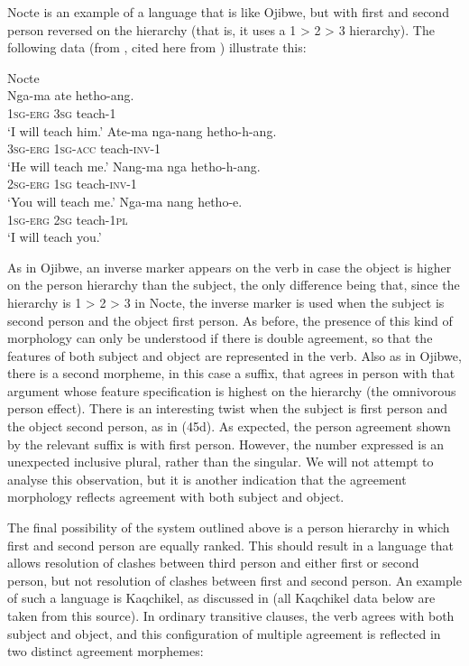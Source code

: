 \documentclass[output=paper]{langsci/langscibook}
\begin{document}
Nocte is an example of a language that is like Ojibwe, but with first and second person reversed on the hierarchy (that is, it uses a 1 > 2 > 3 hierarchy). The following data (from \citealt[641]{DeLancey1981}, cited here from \citealt[172]{Croft2003}) illustrate this:

\ea \label{bkm:Ref328735211}  Nocte\\
\ea\gll  Nga-ma  ate  hetho-ang.  \\
    \textsc{1sg-erg} \textsc{3sg} teach-\textsc{1}\\
\glt    ‘I will teach him.’
\ex \gll  Ate-ma   nga-nang hetho-h-ang.\\
      \textsc{3sg-erg} \textsc{1sg-acc} teach-\textsc{inv-1}\\
\glt     ‘He will teach me.’
\ex \gll Nang-ma nga hetho-h-ang.\\
      \textsc{2sg-erg}  \textsc{1sg} teach-\textsc{inv-1}\\
\glt     ‘You will teach me.’
\ex \gll Nga-ma  nang hetho-e.\\
     \textsc{1sg}-\textsc{erg} \textsc{2sg} teach-\textsc{1pl}\\
\glt    ‘I will teach you.’
\z \z

As in Ojibwe, an inverse marker appears on the verb in case the object is higher on the person hierarchy than the subject, the only difference being that, since the hierarchy is 1 > 2 > 3 in Nocte, the inverse marker is used when the subject is second person and the object first person.  As before, the presence of this kind of morphology can only be understood if there is double agreement, so that the features of both subject and object are represented in the verb. Also as in Ojibwe, there is a second morpheme, in this case a suffix, that agrees in person with that argument whose feature specification is highest on the hierarchy (the omnivorous person effect). There is an interesting twist when the subject is first person and the object second person, as in (45d). As expected, the person agreement shown by the relevant suffix is with first person. However, the number expressed is an unexpected inclusive plural, rather than the singular. We will not attempt to analyse this observation, but it is another indication that the agreement morphology reflects agreement with both subject and object.

The final possibility of the system outlined above is a person hierarchy in which first and second person are equally ranked. This should result in a language that allows resolution of clashes between third person and either first or second person, but not resolution of clashes between first and second person. An example of such a language is Kaqchikel, as discussed in \citet{Preminger2014} (all Kaqchikel data below are taken from this source). In ordinary transitive clauses, the verb agrees with both subject and object, and this configuration of multiple agreement is reflected in two distinct agreement morphemes:
\end{document}
